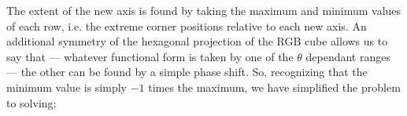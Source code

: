 %

















%



The extent of the new axis is found by taking the maximum and minimum values of each row, i.e. the extreme corner positions relative to each new axis. An additional symmetry of the hexagonal projection of the RGB cube allows us to say that --- whatever functional form is taken by one of the $\theta$ dependant ranges --- the other can be found by a simple phase shift. So, recognizing that the minimum value is simply $-1$ times the maximum, we have simplified the problem to solving:



